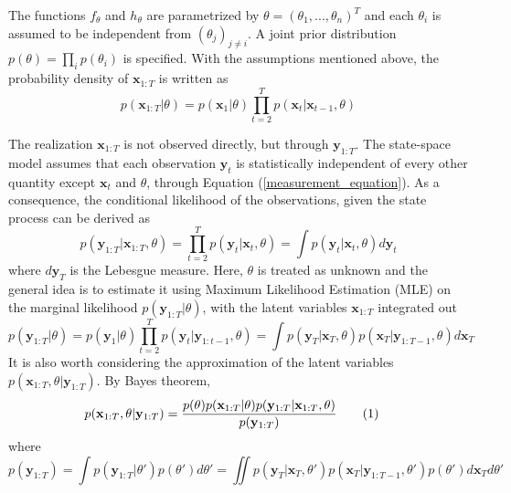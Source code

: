 \documentclass[11pt,a4,twosided,singlespacing,titlepagenumber=on]{scrreprt}
\numberwithin{equation}{chapter} %
\theoremstyle{remark}
\newcommand{\matr}[1]{\mathbf{#1}}
\newcommand\numberthis{\addtocounter{equation}{1}\tag{\theequation}}
\begin{document}
The functions $f_\theta$ and $h_\theta$ are parametrized by $\theta = (\theta_1,...,\theta_n)^T$ and each $\theta_i$ is assumed to be independent from $(\theta_j)_{j \neq i}$. A joint prior distribution $p(\theta) = \prod_i p(\theta_i)$ is specified. With the assumptions mentioned above, the probability density of $\matr{x}_{1:T}$ is written as
\begin{equation}
p(\matr{x}_{1:T} | \theta) = p(\matr{x}_1|\theta) \prod_{t=2}^T p(\matr{x}_t|\matr{x}_{t-1}, \theta) 
\end{equation}

The realization $\matr{x}_{1:T}$ is not observed directly, but through $\matr{y}_{1:T}$. The state-space model assumes that each observation $\matr{y}_t$ is statistically independent of every other quantity except $\matr{x}_t$ and $\theta$, through Equation (\ref{measurement_equation}). As a consequence, the conditional likelihood of the observations, given the state process can be derived as
\begin{equation}
p(\matr{y}_{1:T} | \matr{x}_{1:T}, \theta) = \prod_{t=2}^T p(\matr{y}_t | \matr{x}_t, \theta) = \int p(\matr{y}_t|\matr{x}_t, \theta) d\matr{y}_t
\end{equation}
where $d \matr{y}_T$ is the Lebesgue measure. Here, $\theta$ is treated as unknown and the general idea is to estimate it using Maximum Likelihood Estimation (MLE) on the marginal likelihood $p(\matr{y}_{1:T}|\theta)$, with the latent variables $\matr{x}_{1:T}$ integrated out
\begin{equation}
p(\matr{y}_{1:T} | \theta) = p(\matr{y}_1 |\theta) \prod_{t=2}^T p(\matr{y}_t | \matr{y}_{1:t-1}, \theta) = \int p(\matr{y}_T|\matr{x}_T, \theta) p(\matr{x}_T|\matr{y}_{1:T-1}, \theta) d \matr{x}_T\label{intractable_ssm_2}
\end{equation}
It is also worth considering the approximation of the latent variables $p(\matr{x}_{1:T}, \theta | \matr{y}_{1:T})$. By Bayes theorem,
\begin{align*}
p(\matr{x}_{1:T}, \theta | \matr{y}_{1:T}) &= \frac{ p(\theta)p(\matr{x}_{1:T}|\theta)p(\matr{y}_{1:T}|\matr{x}_{1:T}, \theta) }{p(\matr{y}_{1:T})}\numberthis \label{intractable_ssm}
\end{align*}
where
\begin{equation}
p(\matr{y}_{1:T}) = \int p(\matr{y}_{1:T}|\theta')p(\theta') d\theta' = \iint p(\matr{y}_T|\matr{x}_T, \theta') p(\matr{x}_T|\matr{y}_{1:T-1}, \theta') p(\theta') d \matr{x}_T d\theta'
\end{equation}
\end{document}
